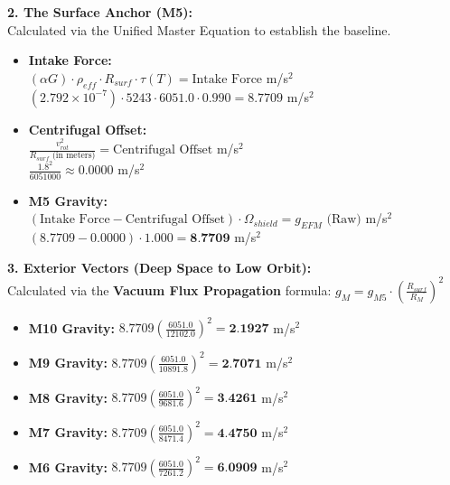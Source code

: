 \documentclass[11pt, a4paper]{article}
\begin{document}
  \vspace{1.0em}
  \noindent \textbf{2. The Surface Anchor (M5):} \\
  \hspace*{1em} Calculated via the Unified Master Equation to establish the baseline.
  \begin{itemize}
    \item \textbf{Intake Force:} \\[0.5em]
    \hspace*{2em} $(\alpha G) \cdot \rho_{eff} \cdot R_{surf} \cdot \tau(T) = \text{Intake Force}$ m/s$^2$ \\[1em]
    \hspace*{2em} $(2.792 \times 10^{-7}) \cdot 5243 \cdot 6051.0 \cdot 0.990 = 8.7709$ m/s$^2$
    
    \item \textbf{Centrifugal Offset:} \\[0.5em]
    \hspace*{2em} $\frac{v_{rot}^2}{R_{surf} \text{ (in meters)}} = \text{Centrifugal Offset}$ m/s$^2$ \\[1em]
    \hspace*{2em} $\frac{1.8^2}{6051000} \approx 0.0000$ m/s$^2$
    
    \item \textbf{M5 Gravity:} \\[0.5em]
    \hspace*{2em} $(\text{Intake Force} - \text{Centrifugal Offset}) \cdot \Omega_{shield} = g_{EFM} \text{ (Raw)}$ m/s$^2$ \\[1em]
    \hspace*{2em} $(8.7709 - 0.0000) \cdot 1.000 = \textbf{8.7709}$ m/s$^2$
  \end{itemize}

  \clearpage
  \noindent \textbf{3. Exterior Vectors (Deep Space to Low Orbit):} \\
  \hspace*{1em} Calculated via the \textbf{Vacuum Flux Propagation} formula: $g_M = g_{M5} \cdot \left( \frac{R_{surf}}{R_M} \right)^2$
  \begin{itemize}
    \item \textbf{M10 Gravity:} $8.7709 \left( \frac{6051.0}{12102.0} \right)^2 = \textbf{2.1927}$ m/s$^2$
    \item \textbf{M9 Gravity:} $8.7709 \left( \frac{6051.0}{10891.8} \right)^2 = \textbf{2.7071}$ m/s$^2$
    \item \textbf{M8 Gravity:} $8.7709 \left( \frac{6051.0}{9681.6} \right)^2 = \textbf{3.4261}$ m/s$^2$
    \item \textbf{M7 Gravity:} $8.7709 \left( \frac{6051.0}{8471.4} \right)^2 = \textbf{4.4750}$ m/s$^2$
    \item \textbf{M6 Gravity:} $8.7709 \left( \frac{6051.0}{7261.2} \right)^2 = \textbf{6.0909}$ m/s$^2$
  \end{itemize}
\end{document}
